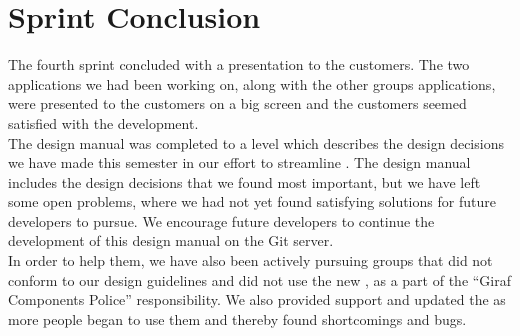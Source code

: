 
\chapter{Sprint Conclusion}
\label{cha:conclusion_sprint_4}

The fourth sprint concluded with a presentation to the customers. The two applications we had been working on, along with the other groups applications, were presented to the customers on a big screen and the customers seemed satisfied with the development. \\

The design manual was completed to a level which describes the design decisions we have made this semester in our effort to streamline \giraf. The design manual includes the design decisions that we found most important, but we have left some open problems, where we had not yet found satisfying solutions for future \giraf developers to pursue. We encourage future \giraf developers to continue the development of this design manual on the \giraf Git server. \\

In order to help them, we have also been actively pursuing groups that did not conform to our design guidelines and did not use the new \gc, as a part of the ``Giraf Components Police'' responsibility. We also provided support and updated the \gc as more people began to use them and thereby found shortcomings and bugs. 